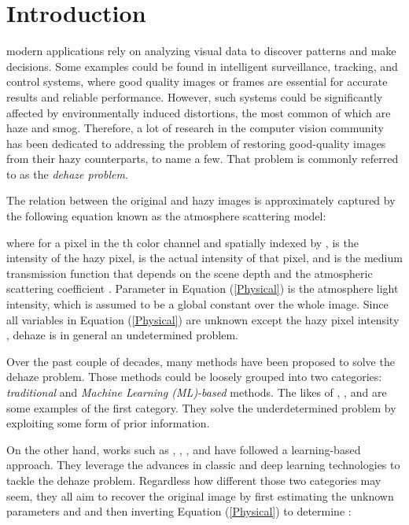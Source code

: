\documentclass[journal]{IEEEtran}
\begin{document}
\section{Introduction}

 modern applications rely on analyzing visual data to discover patterns and make decisions. Some examples could be found in intelligent surveillance, tracking, and control systems, where good quality images or frames are essential for accurate results and reliable performance. However, such systems could be significantly affected by environmentally induced distortions, the most common of which are haze and smog. Therefore, a lot of research in the computer vision community has been dedicated to addressing the problem of restoring good-quality images from their hazy counterparts, \cite{ColorAtten,DehazeNet,DarkChanPrior,berman2016non} to name a few. That problem is commonly referred to as the \textit{dehaze problem}.

The relation between the original and hazy images  \cite{narasimhan2002vision} is approximately captured by the following equation known as the atmosphere scattering model:

where for a pixel in the th color channel and spatially indexed by ,  is the intensity of the hazy pixel,  is the actual intensity of that pixel, and  is the medium transmission function that depends on the scene depth and the atmospheric scattering coefficient . Parameter  in Equation (\ref{Physical}) is the atmosphere light intensity, which is assumed to be a global constant over the whole image. Since all variables in Equation (\ref{Physical}) are unknown except the hazy pixel intensity , dehaze is in general an undetermined problem.

Over the past couple of decades, many methods have been proposed to solve the dehaze problem. Those methods could be loosely grouped into two categories: \textit{traditional} and \textit{Machine Learning (ML)-based} methods. The likes of \cite{DarkChanPrior}, \cite{ColorAtten}, and \cite{MarkovRandField} are some examples of the first category. They solve the underdetermined problem by exploiting some form of  prior information. 



On the other hand, works such as \cite{RandForstReg}, \cite{DehazeNet}, \cite{MultiScaleCNN}, and \cite{AllInOne} have followed a learning-based approach. They leverage the advances in classic and deep learning technologies to tackle the dehaze problem. Regardless how different those two categories may seem, they all aim to recover the original image by first estimating the unknown parameters  and  and then inverting Equation (\ref{Physical}) to determine :
\end{document}
